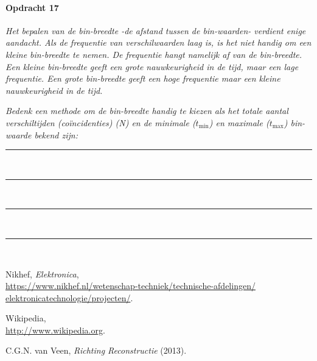 \bigskip{}


\begin{minipage}[t]{1\columnwidth}

\paragraph{Opdracht 17}

\textit{Het bepalen van de bin-breedte -de afstand tussen de bin-waarden-
verdient enige aandacht. Als de frequentie van verschilwaarden laag
is, is het niet handig om een kleine bin-breedte te nemen. De frequentie
hangt namelijk af van de bin-breedte. Een kleine bin-breedte geeft
een grote nauwkeurigheid in de tijd, maar een lage frequentie. Een
grote bin-breedte geeft een hoge frequentie maar een kleine nauwkeurigheid
in de tijd.}

\textit{Bedenk een methode om de bin-breedte handig te kiezen als
het totale aantal verschiltijden (coïncidenties) (N) en de minimale
($t_\textrm{min}$) en maximale ($t_\textrm{max}$) bin-waarde bekend zijn:}

\begin{center}
    \rule{\textwidth}{0.3mm}\\
    \rule{\textwidth}{0.3mm}\\
    \rule{\textwidth}{0.3mm}\\
    \rule{\textwidth}{0.3mm}\\
\end{center}
\end{minipage}


\begin{thebibliography}{9}
     Nikhef, \emph{\hisparc Elektronica},\\
    \url{https://www.nikhef.nl/wetenschap-techniek/technische-afdelingen/
	  elektronicatechnologie/projecten/}.

     Wikipedia, \\
    \url{http://www.wikipedia.org}.

     C.G.N. van Veen, \emph{Richting
    Reconstructie} (2013).
\end{thebibliography}


